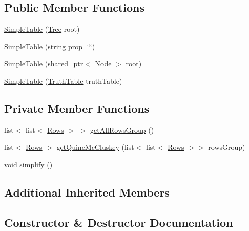 \subsection*{Public Member Functions}
\begin{DoxyCompactItemize}
\item 
\hyperlink{class_simple_table_ae021726ae4be0f56813c3f1306c9097b}{Simple\+Table} (\hyperlink{class_tree}{Tree} root)
\item 
\hyperlink{class_simple_table_a368bd0b80e902560f9cc0e7695a7a5d2}{Simple\+Table} (string prop=\char`\"{}\char`\"{})
\item 
\hyperlink{class_simple_table_afcdfe80e8f2ed145c0baa2cb15722a22}{Simple\+Table} (shared\+\_\+ptr$<$ \hyperlink{class_node}{Node} $>$ root)
\item 
\hyperlink{class_simple_table_a8f2eda31cbfffcafd9e12c7b55ca2dec}{Simple\+Table} (\hyperlink{class_truth_table}{Truth\+Table} truth\+Table)
\end{DoxyCompactItemize}
\subsection*{Private Member Functions}
\begin{DoxyCompactItemize}
\item 
list$<$ list$<$ \hyperlink{class_rows}{Rows} $>$ $>$ \hyperlink{class_simple_table_a34c3e2eb7dcd3c05e22ea56f719913e2}{get\+All\+Rows\+Group} ()
\item 
list$<$ \hyperlink{class_rows}{Rows} $>$ \hyperlink{class_simple_table_a4d4e552c725f1306708a5918365f7d26}{get\+Quine\+Mc\+Cluskey} (list$<$ list$<$ \hyperlink{class_rows}{Rows} $>$$>$ rows\+Group)
\item 
void \hyperlink{class_simple_table_ad94b85aed20f08c4513394cec5d11fe1}{simplify} ()
\end{DoxyCompactItemize}
\subsection*{Additional Inherited Members}


\subsection{Constructor \& Destructor Documentation}
\mbox{\label{class_simple_table_ae021726ae4be0f56813c3f1306c9097b}} 
